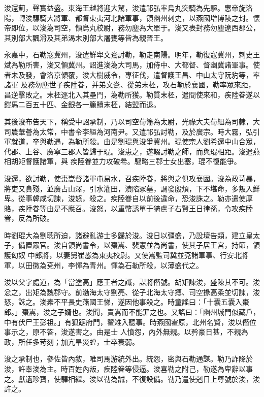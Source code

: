 \begin{pinyinscope}
 浚還薊，聲實益盛。東海王越將迎大駕，浚遣祁弘率烏丸突騎為先驅。惠帝旋洛陽，轉浚驃騎大將軍、都督東夷河北諸軍事，領幽州刺史，以燕國增博陵之封。懷帝即位，以浚為司空，領烏丸校尉，務勿塵為大單于。浚又表封務勿塵遼西郡公，其別部大飄滑及其弟渴末別部大屠甕等皆為親晉王。



 永嘉中，石勒寇冀州，浚遣鮮卑文鴦討勒，勒走南陽。明年，勒復寇冀州，刺史王斌為勒所害，浚又領冀州。詔進浚為大司馬，加侍中、大都督、督幽冀諸軍事。使者未及發，會洛京傾覆，浚大樹威令，專征伐，遣督護王昌、中山太守阮豹等，率諸軍
 及務勿塵世子疾陸眷，并弟文鴦、從弟末柸，攻石勒於襄國，勒率眾來距，昌逆擊敗之。末柸逐北入其壘門，為勒所獲。勒質末柸，遣間使來和，疾陸眷遂以鎧馬二百五十匹、金銀各一簏贖末柸，結盟而退。



 其後浚布告天下，稱受中詔承制，乃以司空荀籓為太尉，光祿大夫荀組為司隸，大司農華薈為太常，中書令李絙為河南尹。又遣祁弘討勒，及於廣宗。時大霧，弘引軍就道，卒與勒遇，為勒所殺。由是劉琨與浚爭冀州。琨使宗人劉希還中山合眾，代郡、上谷、廣寧三郡人皆歸于琨。浚患之，遂輟討勒之師，而與琨相距。浚遣燕相胡矩督護諸軍，與
 疾陸眷並力攻破希。驅略三郡士女出塞，琨不復能爭。



 浚還，欲討勒，使棗嵩督諸軍屯易水，召疾陸眷，將與之俱攻襄國。浚為政苛暴，將吏又貪殘，並廣占山澤，引水灌田，漬陷冢墓，調發殷煩，下不堪命，多叛入鮮卑。從事韓咸切諫，浚怒，殺之。疾陸眷自以前後違命，恐浚誅之。勒亦遣使厚賂，疾陸眷等由是不應召。浚怒，以重幣誘單于猗盧子右賢王日律孫，令攻疾陸眷，反為所破。



 時劉琨大為劉聰所迫，諸避亂游士多歸於浚。浚日以彊盛，乃設壇告類，建立皇太子，備置眾官。浚自領尚書令，以棗嵩、裴憲並為尚書，使其子居王宮，持節，領護匈奴
 中郎將，以妻舅崔毖為東夷校尉。又使嵩監司冀並兗諸軍事、行安北將軍，以田徽為兗州，李惲為青州。惲為石勒所殺，以薄盛代之。



 浚以父字處道，為「當塗高」應王者之讖，謀將僭號。胡矩諫浚，盛陳其不可。浚忿之，出矩為魏郡守。前渤海太守劉亮、從子北海太守搏、司空掾高柔並切諫，浚怒，誅之。浚素不平長史燕國王悌，遂因他事殺之。時童謠曰：「十囊五囊入棗郎。」棗嵩，浚之子婿也。浚聞，責嵩而不能罪之也。又謠曰：「幽州城門似藏戶，中有伏尸王彭祖。」有狐踞府門，翟雉入聽事。時燕國霍原，北州名賢，浚以僭位事示之，原不答，浚遂害之。由是士
 人憤怨，內外無親。以矜豪日甚，不親為政，所任多苛刻；加亢旱災蝗，士卒衰弱。



 浚之承制也，參佐皆內敘，唯司馬游統外出。統怨，密與石勒通謀。勒乃詐降於浚，許奉浚為主。時百姓內叛，疾陸眷等侵逼。浚喜勒之附己，勒遂為卑辭以事之。獻遺珍寶，使驛相繼。浚以勒為誠，不復設備。勒乃遣使剋日上尊號於浚，浚許之。




\end{pinyinscope}
